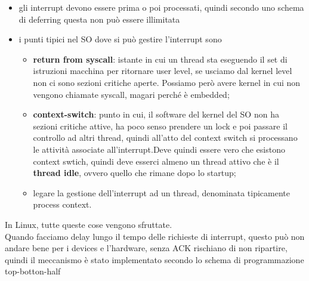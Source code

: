\documentclass[12pt, oneside]{extbook}
\begin{document}
\begin{itemize}
\item gli interrupt devono essere prima o poi processati, quindi secondo uno schema di deferring questa non può essere illimitata
\item i punti tipici nel SO dove si può gestire l'interrupt sono
\begin{itemize}
\item \textbf{return from syscall}: istante in cui un thread sta eseguendo il set di istruzioni macchina per ritornare user level, se usciamo dal kernel level non ci sono sezioni critiche aperte. Possiamo però avere kernel in cui non vengono chiamate syscall, magari perché è embedded;
\item \textbf{context-switch}: punto in cui, il software del kernel del SO non ha sezioni critiche attive, ha poco senso prendere un lock e poi passare il controllo ad altri thread, quindi all'atto del context switch si processano le attività associate all'interrupt.Deve quindi essere vero che esistono context swtich, quindi deve esserci almeno un thread attivo che è il \textbf{thread idle}, ovvero quello che rimane dopo lo startup;
\item legare la gestione dell'interrupt ad un thread, denominata tipicamente process context.
\end{itemize}
\end{itemize}
In Linux, tutte queste cose vengono sfruttate.\\Quando facciamo delay lungo il tempo delle richieste di interrupt, questo può non andare bene per i devices e l'hardware, senza ACK rischiano di non ripartire, quindi il meccanismo è stato implementato secondo lo schema di programmazione top-botton-half
\end{document}
